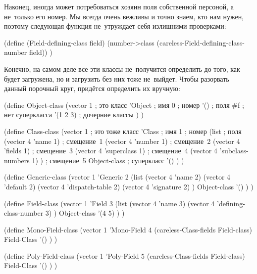 Наконец, иногда может потребоваться хозяин поля собственной персоной, а
не~только его номер. Мы всегда очень вежливы и точно знаем, кто нам нужен,
поэтому следующая функция не~утруждает себя излишними проверками:

\begin{code:lisp}
(define (Field-defining-class field)
  (number->class (careless-Field-defining-class-number field)) )
\end{code:lisp}

Конечно, на самом деле все эти классы не~получится определить до того, как
{\Meroonet} будет загружена, но и загрузить {\Meroonet} без них тоже не~выйдет.
Чтобы разорвать данный порочный круг, придётся определить их вручную:

\begin{code:lisp}
(define Object-class
  (vector
   1                            ; это класс
   'Object                      ; имя
   0                            ; номер
   '()                          ; поля
   #f                           ; нет суперкласса
   '(1 2 3)                     ; дочерние классы
   ) )

(define Class-class
  (vector
   1                                   ; это тоже класс
   'Class                              ; имя
   1                                   ; номер
   (list                               ; поля
    (vector 4 'name             1)     ; смещение~1
    (vector 4 'number           1)     ; смещение~2
    (vector 4 'fields           1)     ; смещение~3
    (vector 4 'superclass       1)     ; смещение~4
    (vector 4 'subclass-numbers 1) )   ; смещение~5
   Object-class                        ; суперкласс
   '()
   ) )

(define Generic-class
  (vector
   1
   'Generic
   2
   (list
    (vector 4 'name           2)
    (vector 4 'default        2)
    (vector 4 'dispatch-table 2)
    (vector 4 'signature      2) )
    Object-class
    '()
    ) )

(define Field-class
  (vector
   1
   'Field
   3
   (list
    (vector 4 'name                  3)
    (vector 4 'defining-class-number 3) )
   Object-class
   '(4 5)
   ) )

(define Mono-Field-class
  (vector 1
          'Mono-Field
          4
          (careless-Class-fields Field-class)
          Field-Class
          '() ) )

(define Poly-Field-class
  (vector 1
          'Poly-Field
          5
          (careless-Class-fields Field-class)
          Field-Class
          '() ) )
\end{code:lisp}

